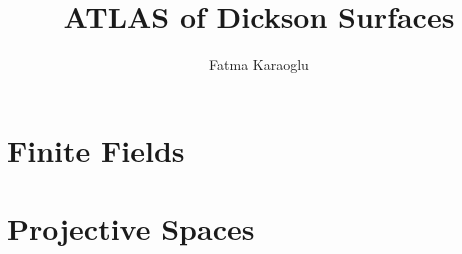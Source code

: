 \documentclass{article}
\newcommand\setTBstruts{\def\T{\rule{0pt}{2.6ex}}%
\def\B{\rule[-1.2ex]{0pt}{0pt}}}
\begin{document}
 
\setTBstruts



{\allowdisplaybreaks%






\title{ATLAS of Dickson Surfaces}
\author{Fatma Karaoglu}%
\maketitle%
%

\section{Finite Fields}

\section{Projective Spaces}


}
\end{document}
